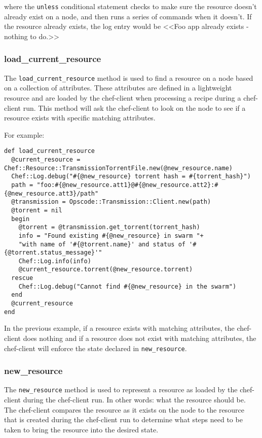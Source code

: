 where the \lstinline!unless! conditional statement checks to make sure the resource doesn't already exist on a node, and then runs a series of commands when it doesn't. If the resource already exists, the log entry would be <<Foo app already exists - nothing to do.>>

\subsubsection{load\_current\_resource}

The \lstinline!load_current_resource! method is used to find a resource on a node based on a collection of attributes. These attributes are defined in a lightweight resource and are loaded by the chef-client when processing a recipe during a chef-client run. This method will ask the chef-client to look on the node to see if a resource exists with specific matching attributes.

For example:

\begin{lstlisting}[label=lst:cookbook-lwrp-dsl-load-current-resource]
def load_current_resource
  @current_resource = Chef::Resource::TransmissionTorrentFile.new(@new_resource.name)
  Chef::Log.debug("#{@new_resource} torrent hash = #{torrent_hash}")
  path = "foo:#{@new_resource.att1}@#{@new_resource.att2}:#{@new_resource.att3}/path"
  @transmission = Opscode::Transmission::Client.new(path)
  @torrent = nil
  begin
    @torrent = @transmission.get_torrent(torrent_hash)
    info = "Found existing #{@new_resource} in swarm "+
    "with name of '#{@torrent.name}' and status of '#{@torrent.status_message}'"
    Chef::Log.info(info)
    @current_resource.torrent(@new_resource.torrent)
  rescue
    Chef::Log.debug("Cannot find #{@new_resource} in the swarm")
  end
  @current_resource
end
\end{lstlisting}

In the previous example, if a resource exists with matching attributes, the chef-client does nothing and if a resource does not exist with matching attributes, the chef-client will enforce the state declared in \lstinline!new_resource!.

\subsubsection{new\_resource}

The \lstinline!new_resource! method is used to represent a resource as loaded by the chef-client during the chef-client run. In other words: what the resource should be. The chef-client compares the resource as it exists on the node to the resource that is created during the chef-client run to determine what steps need to be taken to bring the resource into the desired state.

